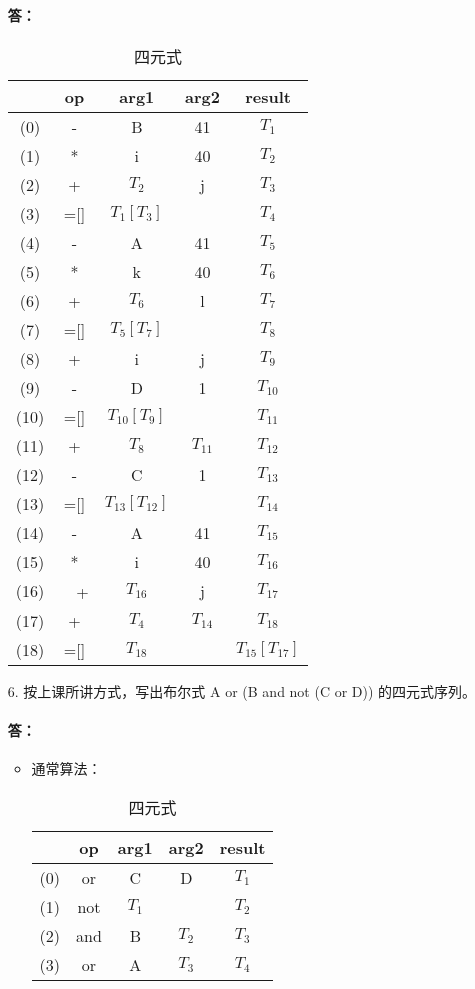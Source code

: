 \documentclass[]{ctexart}
\begin{document}
\begin{enumerate}
	\paragraph{答：}
	\begin{table}[H]
		\centering
		\caption{四元式}
		\begin{tabular}{|c|c|c|c|c|}
			\hline
			~ & op & arg1 & arg2 & result \\\hline
			(0) & - & B & 41 & $T_{1}$ \\
			(1) & * & i & 40 & $T_{2}$ \\
			(2) & + & $T_{2}$ & j & $T_{3}$ \\
			(3) & =[] & $T_{1}[T_{3}]$ & ~ & \textbf{$T_{4}$} \\
			(4) & - & A & 41 & $T_{5}$ \\
			(5) & * & k & 40 & $T_{6}$ \\
			(6) & + & $T_{6}$ & l & $T_{7}$ \\
			(7) & =[] & $T_{5}[T_{7}]$ & ~ & $T_{8}$ \\
			(8) & + & i & j & $T_{9}$ \\
			(9) & - & D & 1 & $T_{10}$ \\
			(10) & =[] & $T_{10}[T_{9}]$ & ~ & $T_{11}$ \\
			(11) & + & $T_{8}$ & $T_{11}$ & $T_{12}$ \\
			(12) & - & C & 1 & $T_{13}$ \\
			(13) & =[] & $T_{13}[T_{12}]$ & ~ & \textbf{$T_{14}$} \\
			(14) & - & A & 41 & $T_{15}$ \\
			(15) & * & i & 40 & $T_{16}$ \\
			(16) &　+ & $T_{16}$ & j & $T_{17}$ \\
			(17) & + & $T_{4}$ & $T_{14}$ & $T_{18}$ \\
			(18) & =[] & $T_{18}$ & ~ & $T_{15}[T_{17}]$ \\\hline
		\end{tabular}
	\end{table}
	
	\item[6.] 按上课所讲方式，写出布尔式 A or (B and not (C or D)) 的四元式序列。
	\paragraph{答：}
	\begin{itemize}
		\item 通常算法：
		\begin{table}[H]
			\centering
			\caption{四元式}
			\begin{tabular}{|c|c|c|c|c|}
				\hline
				~ & op & arg1 & arg2 & result \\\hline
				(0) & or & C & D & $T_{1}$ \\
				(1) & not & $T_{1}$ & ~ & $T_{2}$ \\
				(2) & and & B & $T_{2}$ & $T_{3}$ \\
				(3) & or & A & $T_{3}$ & $T_{4}$ \\\hline
			\end{tabular}
		\end{table}
	

\end{itemize}
\end{enumerate}
\end{document}
